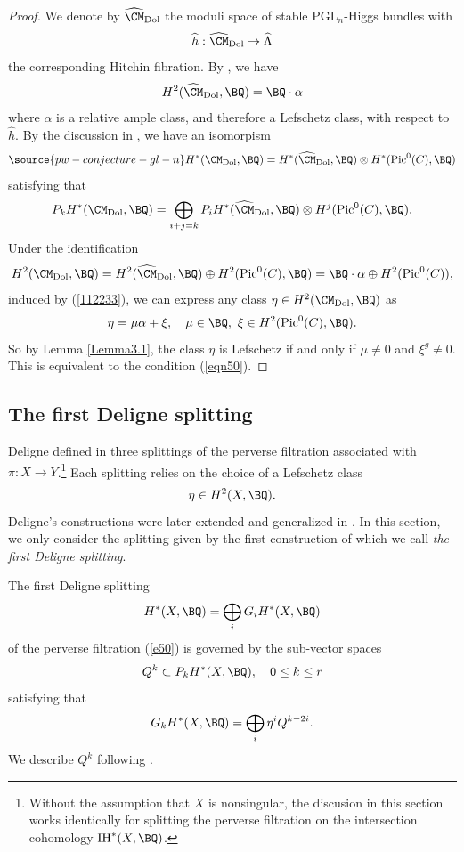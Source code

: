 \begin{proof}
We denote by $\widehat{\CM}_{\mathrm{Dol}}$ the moduli space of stable $\mathrm{PGL}_n$-Higgs bundles with
\[
\widehat{h}: \widehat{\CM}_{\mathrm{Dol}} \to \widehat{\Lambda}
\]
the corresponding Hitchin fibration. By \cite{HT1,Markman}, we have
\[
H^2( \widehat{\CM}_{\mathrm{Dol}}, \BQ ) = \BQ \cdot \alpha
\]
where $\alpha$ is a relative ample class, and therefore a Lefschetz class, with respect to $\widehat{h}$. By the discussion in \cite[Section 2.4]{dCHM1}, we have an isomorpism
\begin{equation}\label{112233}
\source{pw-conjecture-gl-n}
H^*(\CM_{\mathrm{Dol}}, \BQ) = H^*( \widehat{\CM}_{\mathrm{Dol}}, \BQ ) \otimes H^*(\mathrm{Pic}^0(C), \BQ)
\end{equation}
satisfying that
\[
P_k H^*(\CM_{\mathrm{Dol}}, \BQ) = \bigoplus_{i+j=k} P_iH^*( \widehat{\CM}_{\mathrm{Dol}}, \BQ ) \otimes H^j(\mathrm{Pic}^0(C), \BQ).
\]
Under the identification
\[
H^2(\CM_{\mathrm{Dol}}, \BQ) = H^2( \widehat{\CM}_{\mathrm{Dol}}, \BQ ) \oplus H^2(\mathrm{Pic}^0(C), \BQ) = \BQ \cdot \alpha  \oplus H^2(\mathrm{Pic}^0(C)),
\]
induced by (\ref{112233}), we can express any class $\eta \in H^2(\CM_{\mathrm{Dol}}, \BQ)$ as
\[
\eta = \mu \alpha + \xi, \quad \mu \in \BQ,~ \xi \in H^2(\mathrm{Pic}^0(C), \BQ).
\]
So by Lemma \ref{Lemma3.1}, the class $\eta$ is Lefschetz if and only if $\mu \neq 0$ and $\xi^g\neq 0$. This is equivalent to the condition (\ref{eqn50}).
\end{proof}

\subsection{The first Deligne splitting}
Deligne defined in \cite{D} three splittings of the perverse filtration associated with $\pi: X\to Y$.\footnote{Without the assumption that $X$ is nonsingular, the discusion in this section works identically for splitting the perverse filtration on the intersection cohomology $\mathrm{IH}^*(X, \BQ)$.} Each splitting relies on the choice of a Lefschetz class
\[
\eta \in H^2(X, \BQ).
\]
Deligne's constructions were later extended and generalized in \cite{dC,dCM4}. In this section, we only consider the splitting given by the first construction of \cite{D} which we call \emph{the first Deligne splitting}.


The first Deligne splitting
\[
H^*(X,\BQ) = \bigoplus_{i}G_iH^*(X, \BQ)
\]
of the perverse filtration (\ref{e50}) is governed by the sub-vector spaces
\[
Q^k \subset P_kH^*(X, \BQ),\quad  0\leq k\leq r
\]
satisfying that
\[
G_kH^*(X, \BQ) = \bigoplus_i \eta^i Q^{k-2i}.
\]
We describe $Q^k$ following \cite[Section 2.7]{dCM4}.

